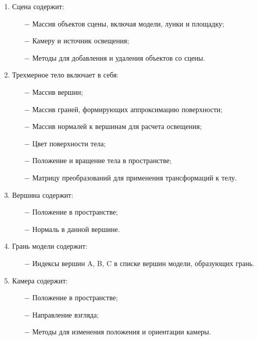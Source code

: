 \begin{enumerate}
    \item Сцена содержит:
    
    \begin{itemize}
        \item[$-$] Массив объектов сцены, включая модели, лунки и площадку;
        \item[$-$] Камеру и источник освещения;
        \item[$-$] Методы для добавления и удаления объектов со сцены.
    \end{itemize}
    
    \item Трехмерное тело включает в себя:
    
    \begin{itemize}
        \item[$-$] Массив вершин;
        \item[$-$] Массив граней, формирующих аппроксимацию поверхности;
        \item[$-$] Массив нормалей к вершинам для расчета освещения;
        \item[$-$] Цвет поверхности тела;
        \item[$-$] Положение и вращение тела в пространстве;
        \item[$-$] Матрицу преобразований для применения трансформаций к телу.
    \end{itemize}
    
    \item Вершина содержит:
    
    \begin{itemize}
        \item[$-$] Положение в пространстве;
        \item[$-$] Нормаль в данной вершине.
    \end{itemize}
    
    \item Грань модели содержит:
    
    \begin{itemize}
        \item[$-$] Индексы вершин A, B, C в списке вершин модели, образующих грань.
    \end{itemize}
    
    \item Камера содержит:
    
    \begin{itemize}
        \item[$-$] Положение в пространстве;
        \item[$-$] Направление взгляда;
        \item[$-$] Методы для изменения положения и ориентации камеры. 
    \end{itemize}
    

\end{enumerate}
